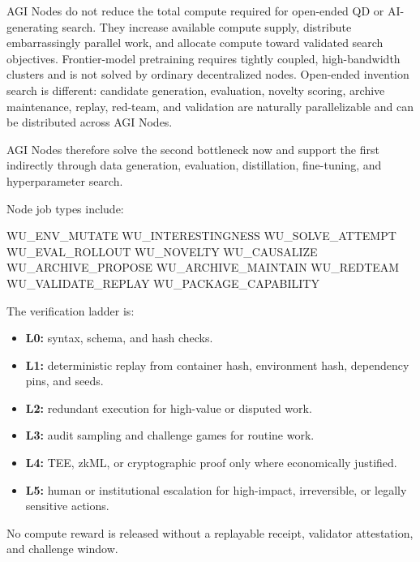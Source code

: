 \documentclass[
  11pt,
]{article}
\newenvironment{Shaded}{}{}
\newcommand{\NormalTok}[1]{#1}
\providecommand{\tightlist}{%
  \setlength{\itemsep}{0pt}\setlength{\parskip}{0pt}}
\begin{document}
AGI Nodes do not reduce the total compute required for open-ended QD or
AI-generating search. They increase available compute supply, distribute
embarrassingly parallel work, and allocate compute toward validated
search objectives. Frontier-model pretraining requires tightly coupled,
high-bandwidth clusters and is not solved by ordinary decentralized
nodes. Open-ended invention search is different: candidate generation,
evaluation, novelty scoring, archive maintenance, replay, red-team, and
validation are naturally parallelizable and can be distributed across
AGI Nodes.

AGI Nodes therefore solve the second bottleneck now and support the
first indirectly through data generation, evaluation, distillation,
fine-tuning, and hyperparameter search.

Node job types include:

\begin{Shaded}
\begin{Highlighting}[]
\NormalTok{WU\_ENV\_MUTATE}
\NormalTok{WU\_INTERESTINGNESS}
\NormalTok{WU\_SOLVE\_ATTEMPT}
\NormalTok{WU\_EVAL\_ROLLOUT}
\NormalTok{WU\_NOVELTY}
\NormalTok{WU\_CAUSALIZE}
\NormalTok{WU\_ARCHIVE\_PROPOSE}
\NormalTok{WU\_ARCHIVE\_MAINTAIN}
\NormalTok{WU\_REDTEAM}
\NormalTok{WU\_VALIDATE\_REPLAY}
\NormalTok{WU\_PACKAGE\_CAPABILITY}
\end{Highlighting}
\end{Shaded}

The verification ladder is:

\begin{itemize}
\tightlist
\item
  \textbf{L0:} syntax, schema, and hash checks.
\item
  \textbf{L1:} deterministic replay from container hash, environment
  hash, dependency pins, and seeds.
\item
  \textbf{L2:} redundant execution for high-value or disputed work.
\item
  \textbf{L3:} audit sampling and challenge games for routine work.
\item
  \textbf{L4:} TEE, zkML, or cryptographic proof only where economically
  justified.
\item
  \textbf{L5:} human or institutional escalation for high-impact,
  irreversible, or legally sensitive actions.
\end{itemize}

No compute reward is released without a replayable receipt, validator
attestation, and challenge window.
\end{document}
